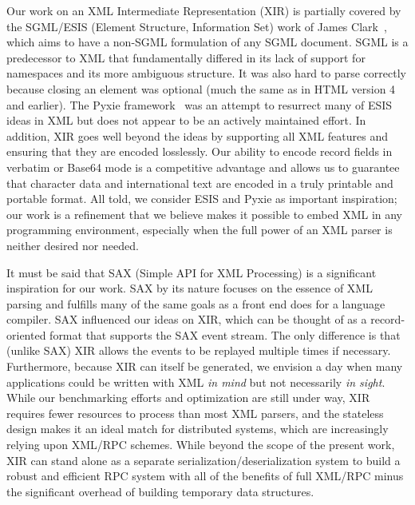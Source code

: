 Our work on an XML Intermediate Representation (XIR) is partially
covered by the SGML/ESIS (Element Structure, Information Set) work of
James Clark~\cite{sgml-esis}, which aims to have a non-SGML
formulation of any SGML document.  SGML is a predecessor to XML that
fundamentally differed in its lack of support for namespaces and its
more ambiguous structure. It was also hard to parse correctly because
closing an element was optional (much the same as in HTML version 4
and earlier). The Pyxie framework~\cite{pyxie} was an attempt to
resurrect many of ESIS ideas in XML but does not appear to be an
actively maintained effort. In addition, XIR goes well beyond the
ideas by supporting all XML features and ensuring that they are
encoded losslessly. Our ability to encode record fields in verbatim or
Base64 mode is a competitive advantage and allows us to guarantee that
character data and international text are encoded in a truly printable
and portable format. All told, we consider ESIS and Pyxie as important
inspiration; our work is a refinement that we believe makes it
possible to embed XML in any programming environment, especially when
the full power of an XML parser is neither desired nor needed.


It must be said that SAX (Simple API for XML Processing) is a
significant inspiration for our work. SAX by its nature focuses on the
essence of XML parsing and fulfills many of the same goals as a front
end does for a language compiler. SAX influenced our ideas on XIR,
which can be thought of as a record-oriented format that supports the
SAX event stream. The only difference is that (unlike SAX) XIR allows
the events to be replayed multiple times if necessary. Furthermore,
because XIR can itself be generated, we envision a day when many
applications could be written with XML \emph{in mind} but not
necessarily \emph{in sight}.  While our benchmarking efforts and
optimization are still under way, XIR requires fewer resources to
process than most XML parsers, and the stateless design makes it an
ideal match for distributed systems, which are increasingly relying
upon XML/RPC schemes. While beyond the scope of the present work, XIR
can stand alone as a separate serialization/deserialization system
to build a robust and efficient RPC system with all of the benefits of
full \mbox{XML/RPC} minus the significant overhead of building temporary data
structures.

